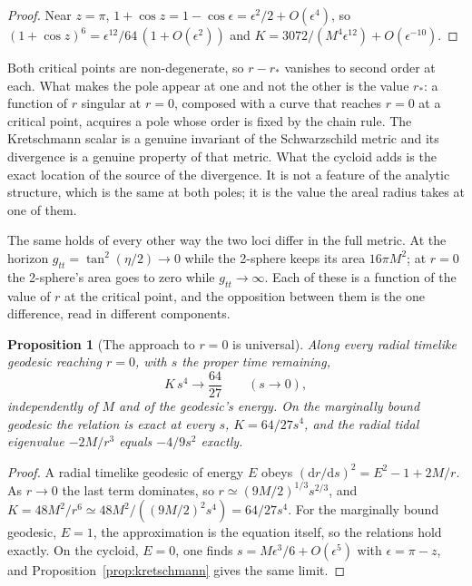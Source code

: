 \documentclass{iopjournal}
\theoremstyle{plain}
\newtheorem{proposition}[theorem]{Proposition}
\theoremstyle{remark}
\newcommand{\dd}{\mathrm{d}}
\begin{document}
\begin{proof}
Near $z=\pi$, $1+\cos z=1-\cos\epsilon=\epsilon^{2}/2+O(\epsilon^{4})$, so $(1+\cos z)^{6}=\epsilon^{12}/64\,(1+O(\epsilon^{2}))$ and $K=3072/(M^{4}\epsilon^{12})+O(\epsilon^{-10})$.
\end{proof}

Both critical points are non-degenerate, so $r-r_{*}$ vanishes to second order at each. What makes the pole appear at one and not the other is the value $r_{*}$: a function of $r$ singular at $r=0$, composed with a curve that reaches $r=0$ at a critical point, acquires a pole whose order is fixed by the chain rule. The Kretschmann scalar is a genuine invariant of the Schwarzschild metric and its divergence is a genuine property of that metric. What the cycloid adds is the exact location of the source of the divergence. It is not a feature of the analytic structure, which is the same at both poles; it is the value the areal radius takes at one of them.

The same holds of every other way the two loci differ in the full metric. At the horizon $g_{tt}=\tan^{2}(\eta/2)\to0$ while the 2-sphere keeps its area $16\pi M^{2}$; at $r=0$ the 2-sphere's area goes to zero while $g_{tt}\to\infty$. Each of these is a function of the value of $r$ at the critical point, and the opposition between them is the one difference, read in different components.

\begin{proposition}[The approach to $r=0$ is universal]\label{prop:universal}
Along every radial timelike geodesic reaching $r=0$, with $s$ the proper time remaining,
\begin{equation}
K\,s^{4}\longrightarrow\frac{64}{27}\qquad(s\to0),
\end{equation}
independently of $M$ and of the geodesic's energy. On the marginally bound geodesic the relation is exact at every $s$, $K=64/27s^{4}$, and the radial tidal eigenvalue $-2M/r^{3}$ equals $-4/9s^{2}$ exactly.
\end{proposition}

\begin{proof}
A radial timelike geodesic of energy $E$ obeys $(\dd r/\dd s)^{2}=E^{2}-1+2M/r$. As $r\to0$ the last term dominates, so $r\simeq(9M/2)^{1/3}s^{2/3}$, and $K=48M^{2}/r^{6}\simeq48M^{2}/((9M/2)^{2}s^{4})=64/27s^{4}$. For the marginally bound geodesic, $E=1$, the approximation is the equation itself, so the relations hold exactly. On the cycloid, $E=0$, one finds $s=M\epsilon^{3}/6+O(\epsilon^{5})$ with $\epsilon=\pi-z$, and Proposition~\ref{prop:kretschmann} gives the same limit.
\end{proof}
\end{document}

